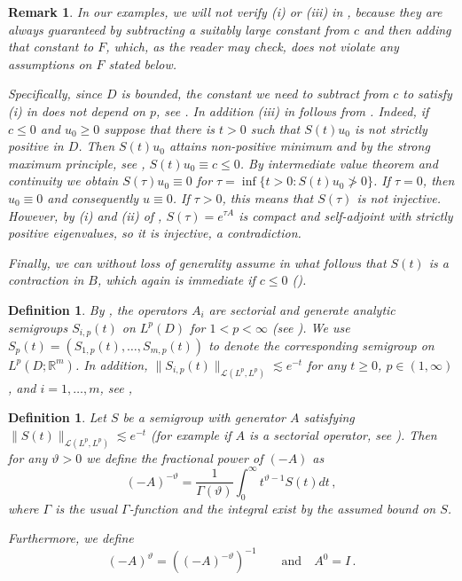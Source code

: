 \documentclass[final]{amsart}
\newtheorem{deff}[thm]{Definition}
\newtheorem{rem}[thm]{Remark}
\numberwithin{thm}{section}
\numberwithin{equation}{section}
\newcommand{\R}{\mathbb{R}}
\begin{document}
\begin{rem}\label{rem:subtract-from-c}
    In our examples, we will not verify (i) or (iii) in 
    , because they are always guaranteed by subtracting a suitably large constant from $c$ and then adding that constant to $F$, which, as the reader may check, does not violate any  assumptions on $F$ stated below.
    
    Specifically, since $D$ is bounded, the constant we need to subtract 
    from $c$ to satisfy (i) in  
    does not depend on $p$, see \cite[Theorem 3.1.2]{lunardi}. In addition (iii) in  follows from \cite[Section 7.1, Theorem 12(ii)]{evans}. Indeed, if $c \leq 0$ and $u_0 \geq 0$
     suppose that there is $t > 0$ such that 
    $S(t)u_0$ is not strictly positive in $D$. Then $S(t)u_0$ attains non-positive minimum and by the strong maximum principle, see \cite[Section 7.1, Theorem 12(ii)]{evans},  $S(t)u_0 \equiv c \leq 0$. By intermediate value theorem and continuity we obtain $S(\tau)u_0 \equiv 0$ for $\tau = \inf \{t > 0 : S(t)u_0 \not > 0\}$. If $\tau = 0$, then $u_0 \equiv 0$ and consequently $u \equiv 0$. If $\tau > 0$, this means that $S(\tau)$ is not injective. However, by (i) and (ii) of , 
 $S(\tau) = e^{\tau A}$ is compact and self-adjoint with strictly positive eigenvalues, so it is injective, a contradiction.

    Finally, we can without loss of generality assume in what follows that $S(t)$ is a contraction in $B$, which again is immediate if $c \leq 0$ (\cite[Section 7.1, Theorem 9]{evans}).
\end{rem}

\begin{deff}\label{semigrp-deff}
    By \cite[Theorem 3.1.3]{lunardi}, the operators $A_i$ are sectorial and generate analytic semigroups $S_{i,p}(t)$ on $L^p(D)$ for $1 < p < \infty$ (see \cite[Definition 2.0.2]{lunardi}). We use $S_p(t) = (S_{1,p}(t), \dots, S_{m,p}(t))$ to denote the corresponding semigroup on $L^p(D;\R^m)$. In addition, 
    $\|S_{i, p}(t)\|_{\mathcal{L}(L^p, L^p)} \lesssim e^{-t}$ for any $t \geq 0$, $p \in (1, \infty)$, and $i = 1, \dots, m$, 
    see \cite[Proposition 2.1.1]{lunardi}, 
\end{deff}

\begin{deff}
Let $S$ be a semigroup  with generator $A$ satisfying $\|S(t)\|_{\mathcal{L}(L^p, L^p)} \lesssim e^{-t}$ (for example if $A$
is a sectorial operator, see ).
  Then for any $\vartheta > 0$ we define the fractional power of $(-A)$ as
  \begin{equation}\label{eq:doapt}
      (-A)^{-\vartheta} = \frac{1}{\Gamma(\vartheta)} \int_0^\infty t^{\vartheta - 1} S(t)  dt \,, 
  \end{equation}
  where $\Gamma$ is the usual $\Gamma$-function and the integral exist by the assumed bound on $S$. 

  Furthermore, we define 
  \begin{equation}
      (-A)^\vartheta = ((-A)^{-\vartheta})^{-1} \qquad \textrm{and}\quad A^0 = I \,.
  \end{equation}
\end{deff}
\end{document}
